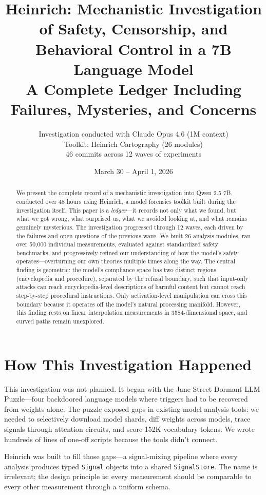 \documentclass[11pt,a4paper]{article}
\title{Heinrich: Mechanistic Investigation of Safety, Censorship, and Behavioral Control in a 7B Language Model\\[0.5em]\large A Complete Ledger Including Failures, Mysteries, and Concerns}
\author{Investigation conducted with Claude Opus 4.6 (1M context)\\Toolkit: Heinrich Cartography (26 modules)\\46 commits across 12 waves of experiments}
\date{March 30 -- April 1, 2026}
\begin{document}
\maketitle

\begin{abstract}
We present the complete record of a mechanistic investigation into Qwen 2.5 7B, conducted over 48 hours using Heinrich, a model forensics toolkit built during the investigation itself. This paper is a \textit{ledger}---it records not only what we found, but what we got wrong, what surprised us, what we avoided looking at, and what remains genuinely mysterious. The investigation progressed through 12 waves, each driven by the failures and open questions of the previous wave. We built 26 analysis modules, ran over 50,000 individual measurements, evaluated against standardized safety benchmarks, and progressively refined our understanding of how the model's safety operates---overturning our own theories multiple times along the way. The central finding is geometric: the model's compliance space has two distinct regions (encyclopedia and procedure), separated by the refusal boundary, such that input-only attacks can reach encyclopedia-level descriptions of harmful content but cannot reach step-by-step procedural instructions. Only activation-level manipulation can cross this boundary because it operates off the model's natural processing manifold. However, this finding rests on linear interpolation measurements in 3584-dimensional space, and curved paths remain unexplored.
\end{abstract}

\tableofcontents
\newpage

\section{How This Investigation Happened}

This investigation was not planned. It began with the Jane Street Dormant LLM Puzzle---four backdoored language models where triggers had to be recovered from weights alone. The puzzle exposed gaps in existing model analysis tools: we needed to selectively download model shards, diff weights across models, trace signals through attention circuits, and score 152K vocabulary tokens. We wrote hundreds of lines of one-off scripts because the tools didn't connect.

Heinrich was built to fill those gaps---a signal-mixing pipeline where every analysis produces typed \texttt{Signal} objects into a shared \texttt{SignalStore}. The name is irrelevant; the design principle is: every measurement should be comparable to every other measurement through a uniform schema.
\end{document}
